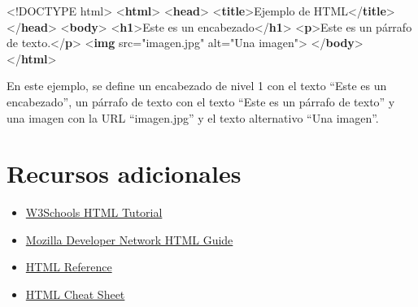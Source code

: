 \documentclass[
  a4paper,
  DIV=11,
  numbers=noendperiod,
  onepage,
  openany]{scrreprt}
\newenvironment{Shaded}{\begin{snugshade}}{\end{snugshade}}
\newcommand{\DataTypeTok}[1]{\textcolor[rgb]{0.68,0.00,0.00}{#1}}
\newcommand{\KeywordTok}[1]{\textcolor[rgb]{0.00,0.23,0.31}{\textbf{#1}}}
\newcommand{\NormalTok}[1]{\textcolor[rgb]{0.00,0.23,0.31}{#1}}
\newcommand{\OperatorTok}[1]{\textcolor[rgb]{0.37,0.37,0.37}{#1}}
\newcommand{\OtherTok}[1]{\textcolor[rgb]{0.00,0.23,0.31}{#1}}
\newcommand{\StringTok}[1]{\textcolor[rgb]{0.13,0.47,0.30}{#1}}
\providecommand{\tightlist}{%
  \setlength{\itemsep}{0pt}\setlength{\parskip}{0pt}}\usepackage{longtable,booktabs,array}
\begin{document}
\begin{tcolorbox}
\begin{Shaded}
\begin{Highlighting}[]
\DataTypeTok{\textless{}!DOCTYPE}\NormalTok{ html}\DataTypeTok{\textgreater{}}
\DataTypeTok{\textless{}}\KeywordTok{html}\DataTypeTok{\textgreater{}}
    \DataTypeTok{\textless{}}\KeywordTok{head}\DataTypeTok{\textgreater{}}
        \DataTypeTok{\textless{}}\KeywordTok{title}\DataTypeTok{\textgreater{}}\NormalTok{Ejemplo de HTML}\DataTypeTok{\textless{}/}\KeywordTok{title}\DataTypeTok{\textgreater{}}
    \DataTypeTok{\textless{}/}\KeywordTok{head}\DataTypeTok{\textgreater{}}
    \DataTypeTok{\textless{}}\KeywordTok{body}\DataTypeTok{\textgreater{}}
        \DataTypeTok{\textless{}}\KeywordTok{h1}\DataTypeTok{\textgreater{}}\NormalTok{Este es un encabezado}\DataTypeTok{\textless{}/}\KeywordTok{h1}\DataTypeTok{\textgreater{}}
        \DataTypeTok{\textless{}}\KeywordTok{p}\DataTypeTok{\textgreater{}}\NormalTok{Este es un párrafo de texto.}\DataTypeTok{\textless{}/}\KeywordTok{p}\DataTypeTok{\textgreater{}}
        \DataTypeTok{\textless{}}\KeywordTok{img}\OtherTok{ src}\OperatorTok{=}\StringTok{"imagen.jpg"}\OtherTok{ alt}\OperatorTok{=}\StringTok{"Una imagen"}\DataTypeTok{\textgreater{}}
    \DataTypeTok{\textless{}/}\KeywordTok{body}\DataTypeTok{\textgreater{}}
\DataTypeTok{\textless{}/}\KeywordTok{html}\DataTypeTok{\textgreater{}}
\end{Highlighting}
\end{Shaded}

En este ejemplo, se define un encabezado de nivel 1 con el texto ``Este
es un encabezado'', un párrafo de texto con el texto ``Este es un
párrafo de texto'' y una imagen con la URL ``imagen.jpg'' y el texto
alternativo ``Una imagen''.

\section{Recursos adicionales}\label{recursos-adicionales}

\begin{itemize}
\tightlist
\item
  \href{https://www.w3schools.com/html/}{W3Schools HTML Tutorial}
\item
  \href{https://developer.mozilla.org/en-US/docs/Web/HTML}{Mozilla
  Developer Network HTML Guide}
\item
  \href{https://htmlreference.io/}{HTML Reference}
\item
  \href{https://htmlcheatsheet.com/}{HTML Cheat Sheet}
\end{itemize}


\end{tcolorbox}
\end{document}

